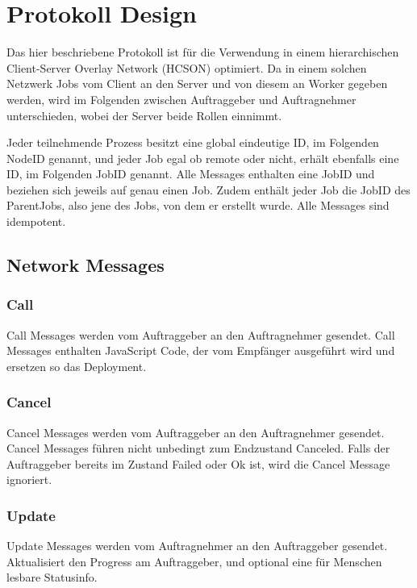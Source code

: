 
\chapter{Protokoll Design}
Das hier beschriebene Protokoll ist für die Verwendung in einem hierarchischen Client-Server Overlay Network (HCSON) optimiert.
Da in einem solchen Netzwerk Jobs vom Client an den Server und von diesem an Worker gegeben werden, wird im Folgenden zwischen Auftraggeber und Auftragnehmer unterschieden, wobei der Server beide Rollen einnimmt.

Jeder teilnehmende Prozess besitzt eine global eindeutige ID, im Folgenden NodeID genannt, und jeder Job egal ob remote oder nicht, erhält ebenfalls eine ID, im Folgenden JobID genannt.
Alle Messages enthalten eine JobID und beziehen sich jeweils auf genau einen Job.
Zudem enthält jeder Job die JobID des ParentJobs, also jene des Jobs, von dem er erstellt wurde.
Alle Messages sind idempotent.




\section{Network Messages}

\subsection{Call}
Call Messages werden vom Auftraggeber an den Auftragnehmer gesendet.
Call Messages enthalten JavaScript Code, der vom Empfänger ausgeführt wird und ersetzen so das Deployment.


\subsection{Cancel}
Cancel Messages werden vom Auftraggeber an den Auftragnehmer gesendet.
Cancel Messages führen nicht unbedingt zum Endzustand Canceled.
Falls der Auftraggeber bereits im Zustand Failed oder Ok ist, wird die Cancel Message ignoriert.



\subsection{Update}
Update Messages werden vom Auftragnehmer an den Auftraggeber gesendet.
Aktualisiert den Progress am Auftraggeber, und optional eine für Menschen lesbare Statusinfo.

